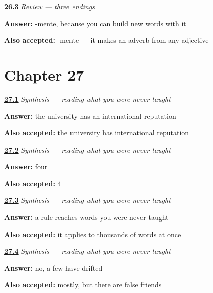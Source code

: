 \noindent\begin{minipage}[t]{\linewidth}
\raggedright
\hyperlink{review-ES-C56-repaso-amigos-kinds}{\textbf{26.3}} \emph{Review — three endings}\par
\small \textbf{Answer:} -mente, because you can build new words with it\par
\footnotesize \textbf{Also accepted:} -mente — it makes an adverb from any adjective
\end{minipage}\par\medskip

\section*{Chapter 27}

\noindent\begin{minipage}[t]{\linewidth}
\raggedright
\hyperlink{review-ES-C56-sintesis-leer-read}{\textbf{27.1}} \emph{Synthesis — reading what you were never taught}\par
\small \textbf{Answer:} the university has an international reputation\par
\footnotesize \textbf{Also accepted:} the university has international reputation
\end{minipage}\par\medskip

\noindent\begin{minipage}[t]{\linewidth}
\raggedright
\hyperlink{review-ES-C56-sintesis-leer-count}{\textbf{27.2}} \emph{Synthesis — reading what you were never taught}\par
\small \textbf{Answer:} four\par
\footnotesize \textbf{Also accepted:} 4
\end{minipage}\par\medskip

\noindent\begin{minipage}[t]{\linewidth}
\raggedright
\hyperlink{review-ES-C56-sintesis-leer-shape}{\textbf{27.3}} \emph{Synthesis — reading what you were never taught}\par
\small \textbf{Answer:} a rule reaches words you were never taught\par
\footnotesize \textbf{Also accepted:} it applies to thousands of words at once
\end{minipage}\par\medskip

\noindent\begin{minipage}[t]{\linewidth}
\raggedright
\hyperlink{review-ES-C56-sintesis-leer-limit}{\textbf{27.4}} \emph{Synthesis — reading what you were never taught}\par
\small \textbf{Answer:} no, a few have drifted\par
\footnotesize \textbf{Also accepted:} mostly, but there are false friends
\end{minipage}\par\medskip

